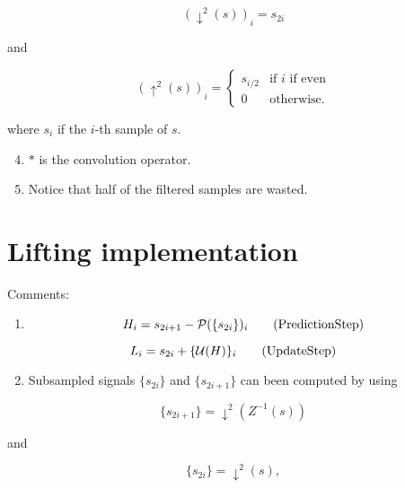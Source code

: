 \begin{equation}
    (\downarrow^2(s))_i = s_{2i}
  \end{equation}

and

\begin{equation}
    (\uparrow^2(s))_i =
  \left\{
  \begin{array}{ll}
    s_{i/2} & \text{if $i$ if even} \\
    0 & \text{otherwise}.
  \end{array}
  \right.
  \end{equation}

where \(s_i\) if the \(i\)-th sample of \(s\).

\begin{enumerate}
\setcounter{enumi}{3}
\item
  \(*\) is the convolution operator.
\item
  Notice that half of the filtered samples are wasted.
\end{enumerate}

\section{Lifting implementation~\cite{sweldens1997building}}
Comments:

\begin{enumerate}
\tightlist
\item
  \begin{equation}
  H_i = s_{2i+1} - {\cal P}(\{s_{2i}\})_i
  \tag{PredictionStep}
  \label{eq:PredictionStep}
  \end{equation}
\end{enumerate}

\begin{equation}
  L_i = s_{2i} + \{{\cal U}(H)\}_i
  \tag{UpdateStep}
  \label{eq:UpdateStep}
\end{equation}

\begin{enumerate}
\setcounter{enumi}{1}
\tightlist
\item
  Subsampled signals \(\{s_{2i}\}\) and \(\{s_{2i+1}\}\) can been
  computed by using
\end{enumerate}

\begin{equation*}
   \{s_{2i+1}\} = \downarrow^2(Z^{-1}(s))
\end{equation*}

and

\begin{equation*}
   \{s_{2i}\} = \downarrow^2(s),
\end{equation*}

